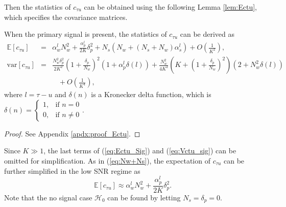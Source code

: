 \documentclass[draftclsnofoot,onecolumn,12pt]{IEEEtran}
\begin{document}
Then the statistics of $c_{\tau u}$ can be obtained using the following Lemma \ref{lem:Ectu}, which specifies the covariance matrices. 
\begin{lemma}\label{lem:Ectu}
When the primary signal is present, the statistics of $c_{\tau u}$ can be derived as
  \begin{eqnarray}
\mathbb{E}[c_{ \tau u }] &=& \alpha_w^l N_w^2 + \frac{\alpha_p^l}{2K}\delta_p^2 + N_s \left(N_w + (N_s + N_w)\alpha_s^l \right) + O(\frac{1}{K^2}), \label{eq:Ectu_Sig} \\
    \mathrm{var}[c_{ \tau u }] &=&  \frac{N_w^2\delta_p^2}{2K^2} \left(1 + \frac{\delta_p}{N_w}\right)^2 \left(1 + \alpha_p^l \delta(l) \right) +
    \frac{N_w^2}{4K^2} \left( K + \left(1+\frac{\delta_p}{N_w}\right)^2 \right) \left( 2 + N_w^2\delta(l) \right) \nonumber \\
     & & \;\;\; + O(\frac{1}{K^4}),  \label{eq:Vctu_sig}
  \end{eqnarray}
  where $l = \tau - u$ and
	$\delta(n)$ is a Kronecker delta function, which is $\delta(n) = \left\{\begin{smallmatrix} 1, & \text{if $n = 0$} \\
	  			0, & \text{if $n \neq 0$} \end{smallmatrix} \right.$.
\end{lemma}

\begin{proof}
  See Appendix \ref{apdx:proof_Ectu}.
\end{proof}

Since $K \gg 1$, the last terms of (\ref{eq:Ectu_Sig}) and (\ref{eq:Vctu_sig}) can be omitted for simplification. As in (\ref{eq:Nw+Ns}), the expectation of $c_{\tau u}$ can be further simplified in the low SNR regime as
\begin{equation}
    \mathbb{E}[c_{ \tau u }] \approx \alpha_w^l N_w^2 + \frac{\alpha_p^l}{2K} \delta_p^2. \label{eq:Ectu_sig}
\end{equation}
Note that the no signal case $\mathcal{H}_0$ can be found by letting $N_s = \delta_p = 0$.
\end{document}
